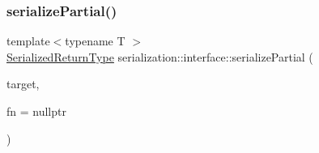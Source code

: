 \subsubsection{\texorpdfstring{serialize\+Partial()}{serializePartial()}}
{\footnotesize\ttfamily template$<$typename T $>$ \\
\hyperlink{namespaceserialization_1_1interface_a53410d9804c330ddfaf562ddc8e3c681}{Serialized\+Return\+Type} serialization\+::interface\+::serialize\+Partial (\begin{DoxyParamCaption}\item[{T \&}]{target,  }\item[{\hyperlink{namespaceserialization_1_1interface_ae1f3fc9ceb0366ab6a877a78ee7377a2}{Buffer\+Callback\+Type}}]{fn = {\ttfamily nullptr} }\end{DoxyParamCaption})}

